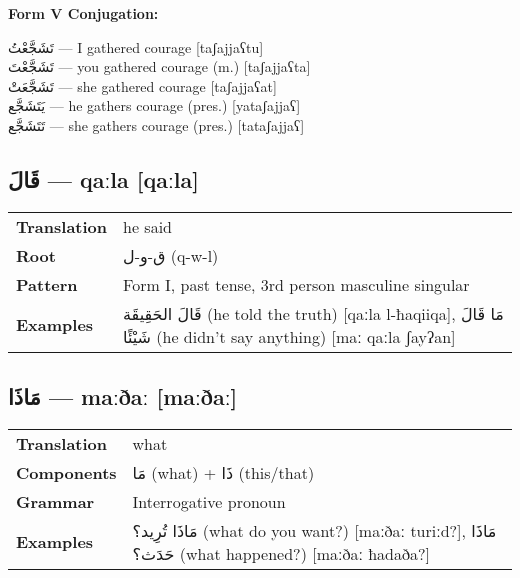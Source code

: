 \documentclass[a4paper,12pt]{article}
\begin{document}
\textbf{Form V Conjugation:}
\begin{multicols}{2}
\small
\textarabic{تَشَجَّعْتُ} — I gathered courage [taʃajjaʕtu] \\
\textarabic{تَشَجَّعْتَ} — you gathered courage (m.) [taʃajjaʕta] \\
\textarabic{تَشَجَّعَتْ} — she gathered courage [taʃajjaʕat] \\
\textarabic{يَتَشَجَّع} — he gathers courage (pres.) [yataʃajjaʕ] \\
\textarabic{تَتَشَجَّع} — she gathers courage (pres.) [tataʃajjaʕ]
\end{multicols}

\subsection{\textarabic{قَالَ} — \textbf{qaːla} [qaːla]}
\begin{tabular}{p{3cm}p{10cm}}
\toprule
\textbf{Translation} & he said \\
\textbf{Root} & \textarabic{ق-و-ل} (q-w-l) \\
\textbf{Pattern} & Form I, past tense, 3rd person masculine singular \\
\textbf{Examples} & \textarabic{قَالَ الحَقِيقَة} (he told the truth) [qaːla l-ħaqiiqa], \textarabic{مَا قَالَ شَيْئًا} (he didn't say anything) [maː qaːla ʃayʔan] \\
\bottomrule
\end{tabular}

\subsection{\textarabic{مَاذَا} — \textbf{maːðaː} [maːðaː]}
\begin{tabular}{p{3cm}p{10cm}}
\toprule
\textbf{Translation} & what \\
\textbf{Components} & \textarabic{مَا} (what) + \textarabic{ذَا} (this/that) \\
\textbf{Grammar} & Interrogative pronoun \\
\textbf{Examples} & \textarabic{مَاذَا تُرِيد؟} (what do you want?) [maːðaː turiːd?], \textarabic{مَاذَا حَدَث؟} (what happened?) [maːðaː ħadaða?] \\
\bottomrule
\end{tabular}
\end{document}
